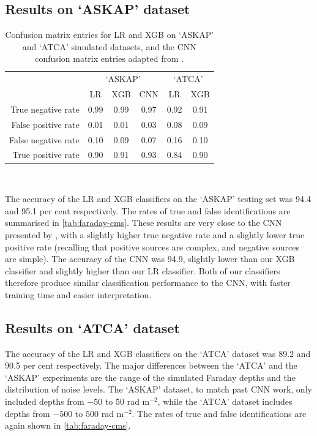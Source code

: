   \subsection{Results on `ASKAP' dataset}
  \label{sec:faraday-cnn-comparison}

    \begin{table}[htbp]
      \caption{\label{tab:faraday-cms} Confusion matrix entries for LR and XGB on `ASKAP' and `ATCA' simulated datasets, and the CNN confusion matrix entries adapted from \citet{brown_classifying_2018}.}
      \centering
      \begin{tabular}{r|ccc|cc}
        \hline\hline
        & \multicolumn{3}{c}{`ASKAP'} & \multicolumn{2}{c}{`ATCA'} \\
        & LR & XGB & CNN & LR & XGB \\
        \hline
        True negative rate & 0.99 & 0.99 & 0.97 & 0.92 & 0.91\\
        False positive rate & 0.01 & 0.01 & 0.03 & 0.08 & 0.09\\
        False negative rate & 0.10 & 0.09 & 0.07 & 0.16 & 0.10\\
        True positive rate & 0.90 & 0.91 & 0.93 & 0.84 & 0.90\\
        \hline\hline
      \end{tabular}\\
    \end{table}

    The accuracy of the LR and XGB classifiers on the `ASKAP' testing set was 94.4 and 95.1 per cent respectively. The rates of true and false identifications are summarised in \autoref{tab:faraday-cms}. These results are very close to the CNN presented by \citet{brown_classifying_2018}, with a slightly higher true negative rate and a slightly lower true positive rate (recalling that positive sources are complex, and negative sources are simple). The accuracy of the CNN was 94.9, slightly lower than our XGB classifier and slightly higher than our LR classifier. Both of our classifiers therefore produce similar classification performance to the CNN, with faster training time and easier interpretation.

  \subsection{Results on `ATCA' dataset}
  \label{sec:faraday-results-simulated}

    The accuracy of the LR and XGB classifiers on the `ATCA' dataset was 89.2 and 90.5 per cent respectively. The major differences between the `ATCA' and the `ASKAP' experiments are the range of the simulated Faraday depths and the distribution of noise levels. The `ASKAP' dataset, to match past CNN work, only included depths from $-50$ to $50$ rad m$^{-2}$, while the `ATCA' dataset includes depths from $-500$ to $500$ rad m$^{-2}$. The rates of true and false identifications are again shown in \autoref{tab:faraday-cms}.

